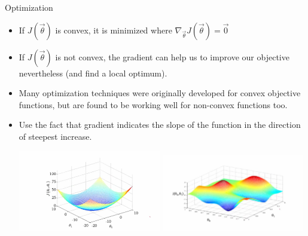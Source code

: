 \begin{vbframe}{Optimization}

\vfill

\begin{itemize}
\item If $J(\vec \theta)$ is convex, it is minimized where $\nabla_{\vec\theta} J(\vec \theta) = \vec 0$
\item If $J(\vec \theta)$ is not convex, the gradient can help us to improve our objective nevertheless (and find a local optimum).
\item Many optimization techniques were originally developed for convex objective functions, but are found to be working well for non-convex functions too.
\item Use the fact that gradient indicates the slope of the function in the direction of steepest increase.
\begin{center}
\includegraphics[width = 0.49\textwidth]{./figure/convex_cost_function} \includegraphics[width = 0.49\textwidth]{./figure/nonconvex}
\end{center}

\end{itemize}
\begin{center}
\end{center}

\vfill

\end{vbframe}



